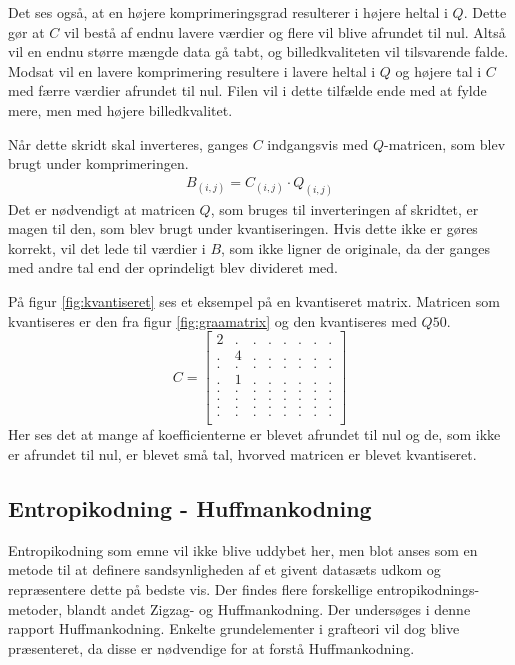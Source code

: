 Det ses også, at en højere komprimeringsgrad resulterer i højere heltal i $Q$. Dette gør at $C$ vil bestå af endnu lavere værdier og flere vil blive afrundet til nul. Altså vil en endnu større mængde data gå tabt, og billedkvaliteten vil tilsvarende falde. Modsat vil en lavere komprimering resultere i lavere heltal i $Q$ og højere tal i $C$ med færre værdier afrundet til nul. Filen vil i dette tilfælde ende med at fylde mere, men med højere billedkvalitet.

Når dette skridt skal inverteres, ganges $C$ indgangsvis med $Q$-matricen, som blev brugt under komprimeringen.
\begin{align}
B_{(i,j)}=C_{(i,j)} \cdot Q_{(i,j)}
\end{align}
Det er nødvendigt at matricen $Q$, som bruges til inverteringen af skridtet, er magen til den, som blev brugt under kvantiseringen. Hvis dette ikke er gøres korrekt, vil det lede til værdier i $B$, som ikke ligner de originale, da der ganges med andre tal end der oprindeligt blev divideret med.

På figur \ref{fig:kvantiseret} ses et eksempel på en kvantiseret matrix. Matricen som kvantiseres er den fra figur \vref{fig:graamatrix} og den kvantiseres med $Q50$.
\begin{equation}
	C=
\begin{bmatrix}
	2	&	.	& .		& .		& 	.	&	.	& .		& .	\\
	.	&	4	& .		& .		& 	.	& 	.	& .		& .	\\
	.	&	.	& .		& .		& 	.	& 	.	& .		& .	\\
	.	&	1	& .		& .		& 	.	& 	.	& .		& .	\\
	.	&	.	& .		& .		& 	.	& 	.	& .		& .	\\
	.	&	.	& .		& .		& 	.	& 	.	& .		& .	\\
	.	&	.	& .		& .		& 	.	& 	.	& .		& .	\\
	.	&	.	& .		& .		& 	.	& 	.	& .		& .	\\
\end{bmatrix}
\label{fig:kvantiseret}
\end{equation}
Her ses det at mange af koefficienterne er blevet afrundet til nul og de, som ikke er afrundet til nul, er blevet små tal, hvorved matricen er blevet kvantiseret.

\subsection{Entropikodning - Huffmankodning}
\label{sec:Huffman}
Entropikodning som emne vil ikke blive uddybet her, men blot anses som en metode til at definere sandsynligheden af et givent datasæts udkom og repræsentere dette på bedste vis. Der findes flere forskellige entropikodnings-metoder, blandt andet Zigzag- og Huffmankodning. Der undersøges i denne rapport Huffmankodning. Enkelte grundelementer i grafteori vil dog blive præsenteret, da disse er nødvendige for at forstå Huffmankodning.

